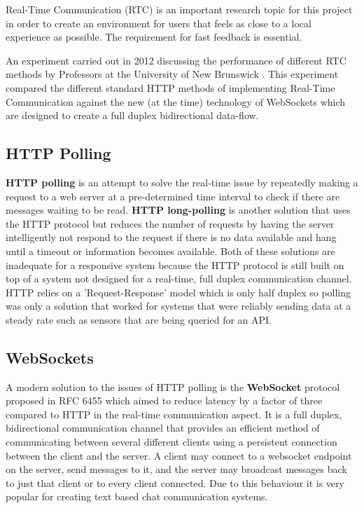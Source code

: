 Real-Time Communication (RTC) is an important research topic for this project in order to create an environment for users that feels as close to a local experience as possible. The requirement for fast feedback is essential.

An experiment carried out in 2012 discussing the performance of different RTC methods by Professors at the University of New Brunswick \cite{websocket}. This experiment compared the different standard HTTP methods of implementing Real-Time Communication against the new (at the time) technology of WebSockets which are designed to create a full duplex bidirectional data-flow.

\subsection{HTTP Polling}

\textbf{HTTP polling} is an attempt to solve the real-time issue by repeatedly making a request to a web server at a pre-determined time interval to check if there are messages waiting to be read. \textbf{HTTP long-polling} is another solution that uses the HTTP protocol but reduces the number of requests by having the server intelligently not respond to the request if there is no data available and hang until a timeout or information becomes available. Both of these solutions are inadequate for a responsive system because the HTTP protocol is still built on top of a system not designed for a real-time, full duplex communication channel. HTTP relies on a 'Request-Response' model which is only half duplex so polling was only a solution that worked for systems that were reliably sending data at a steady rate such as sensors that are being queried for an API.

\subsection{WebSockets}

A modern solution to the issues of HTTP polling is the \textbf{WebSocket} protocol proposed in RFC 6455 \cite{wsrfc} which aimed to reduce latency by a factor of three compared to HTTP in the real-time communication aspect. It is a full duplex, bidirectional communication channel that provides an efficient method of communicating between several different clients using a persistent connection between the client and the server. A client may connect to a websocket endpoint on the server, send messages to it, and the server may broadcast messages back to just that client or to every client connected. Due to this behaviour it is very popular for creating text based chat communication systems.

